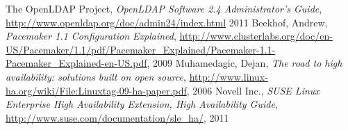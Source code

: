 \documentclass[a4paper,11pt,DIV=12]{scrartcl}
\begin{document}
\begin{thebibliography}{aa}
        The OpenLDAP Project, {\it OpenLDAP Software 2.4 Administrator's Guide},
        \url{http://www.openldap.org/doc/admin24/index.html}
        2011
    \bibitem{}
        Beekhof, Andrew,
        {\it Pacemaker 1.1 Configuration Explained},
        \url{http://www.clusterlabs.org/doc/en-US/Pacemaker/1.1/pdf/Pacemaker_Explained/Pacemaker-1.1-Pacemaker_Explained-en-US.pdf},
        2009
    \bibitem{}Muhamedagic, Dejan,
        {\it The road to high availability: solutions built on open source},
        \linebreak
        \url{http://www.linux-ha.org/wiki/File:Linuxtag-09-ha-paper.pdf},
        2006
    \bibitem{}
        Novell Inc.,
        {\it SUSE Linux Enterprise High Availability Extension,
        High Availability Guide},
        \url{http://www.suse.com/documentation/sle_ha/},
        2011
\end{thebibliography}
\end{document}
